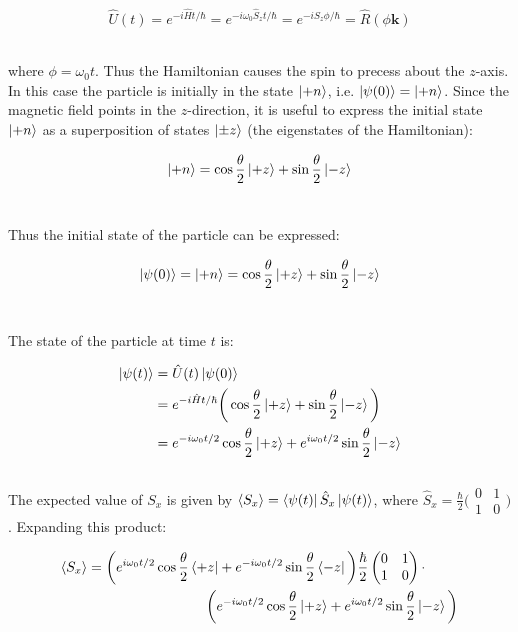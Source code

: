\documentclass[14pt]{extarticle}
\renewcommand{\v}[1]{{\bm #1}}
\begin{document}
$$\hat U(t) = e^{-i \hat H t / \hbar} = e^{-i \omega_0 \hat S_z t / \hbar} = e^{-i S_z \phi / \hbar} = \hat R(\phi \v k)$$ \ 

where $\phi = \omega_0 t$. Thus the Hamiltonian causes the spin to precess about the $z$-axis. \\ 

In this case the particle is initially in the state $\ket{+n}$, i.e. $\ket{\psi(0)} = \ket{+n}$. Since the magnetic field points in the $z$-direction, it is useful to express the initial state $\ket{+n}$ as a superposition of states $\ket{\pm z}$ (the eigenstates of the Hamiltonian):

$$\ket{+n} = \cos \frac \theta 2 \ket{+z} + \sin \frac \theta 2 \ket{-z}$$ \ 

Thus the initial state of the particle can be expressed: 

$$\ket{\psi(0)} = \ket{+n} = \cos \frac \theta 2 \ket{+z} + \sin \frac \theta 2 \ket{-z}$$ \

The state of the particle at time $t$ is:

$$
\begin{aligned}
	\ket{\psi(t)} &= \hat U(t) \ket{\psi(0)} \\ 
	&= e^{-i \hat H t / \hbar} \bigg( \cos \frac \theta 2 \ket{+z} + \sin \frac \theta 2 \ket{-z} \bigg)  \\ 
	&= e^{-i \omega_0 t / 2} \cos \frac \theta 2 \ket{+z} + e^{i\omega_0 t / 2} \sin \frac \theta 2 \ket{-z}
\end{aligned}
$$ \\ 

The expected value of $S_x$ is given by $\langle S_x \rangle = \bra{\psi(t)} \hat S_x \ket{\psi(t)}$, where $\hat S_x = \frac \hbar 2 \big( \begin{smallmatrix} 0 & 1 \\ 1 & 0 \end{smallmatrix} \big)$. Expanding this product:

$$
\begin{aligned}
	\langle S_x \rangle &= \bigg( e^{i\omega_0 t / 2} \cos\frac \theta 2 \bra{+z} + e^{-i \omega_0 t / 2} \sin\frac \theta 2 \bra{-z} \bigg) \frac \hbar 2 \begin{pmatrix} 0 & 1 \\ 1 & 0 \end{pmatrix}  \cdot \\ 
	&\hspace{3cm}\bigg( e^{-i \omega_0 t / 2} \cos \frac \theta 2 \ket{+z} + e^{i\omega_0 t / 2} \sin \frac \theta 2 \ket{-z} \bigg)
\end{aligned}
$$ 
\end{document}
